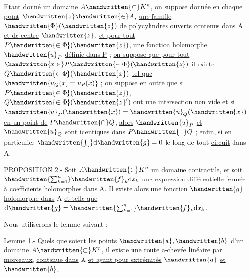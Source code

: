 \uline{Etant donné un domaine} $A\handwritten{\subset}K^n$, \uline{on suppose donnée en chaque point} $\handwritten{z}\handwritten{\in}A$, \uline{une famille} $\handwritten{\Phi}(\handwritten{z})$ \uline{de polycylindres ouverts contenus dans A et de centre} $\handwritten{z}$, \uline{et pour tout} $P\handwritten{\in\Phi}(\handwritten{z})$, \uline{une fonction holomorphe} $\handwritten{u}_P$ \uline{définie dans P} ; \uline{on suppose que pour tout} $\handwritten{x\in}P\handwritten{\in\Phi}(\handwritten{z})$ \uline{il existe} $Q\handwritten{\in\Phi}(\handwritten{x})$ \uline{tel que} $\handwritten{u_Q(x)=u_P(x)}$ ; \uline{on suppose en outre que si} $P\handwritten{\in\Phi}(\handwritten{z})$, $Q\handwritten{\in\Phi}(\handwritten{z}')$ \uline{ont une intersection non vide et si} $\handwritten{u}_P(\handwritten{x})=\handwritten{u}_Q(\handwritten{x})$ \uline{en un point de} $P\handwritten{\cap}Q$, \uline{alors} $\handwritten{u}_P$ \uline{et} $\handwritten{u}_Q$ \uline{sont identiques dans} $P\handwritten{\cap}Q$ ; \uline{enfin, si}
en particulier $\handwritten{\int_\gamma}\mathrm{d}\handwritten{g}=0$ le long de tout \uline{circuit} dans A.

PROPOSITION 2.- \uline{Soit} $A\handwritten{\subset}K^n$ \uline{un domaine} contractile, \uline{et soit} $\handwritten{\sum_{k=1}^n}\handwritten{f}_k\mathrm{d}x_k$ \uline{une expression différentielle fermée à coefficients holomorphes dans} A. \uline{Il existe alors une fonction} $\handwritten{g}$ \uline{holomorphe dans} A \uline{et telle que} $\mathrm{d}\handwritten{g}=\handwritten{\sum_{k=1}^n}\handwritten{f}_k\mathrm{d}x_k$.

Nous utiliserons le lemme suivant :

\uline{Lemme 1}.- \uline{Quels que soient les points} $\handwritten{a},\handwritten{b}$ \uline{d'un domaine} $A\handwritten{\subset}K^n$, \uline{il existe une route a-chevée linéaire par morceaux}, \uline{contenue dans} A \uline{et ayant pour extrémités} $\handwritten{a}$ \uline{et} $\handwritten{b}$.


